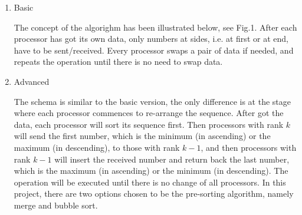 \documentclass[12pt]{article}
\begin{document}
\begin{enumerate}
	\item Basic
	\begin{flushleft}
		The concept of the algorighm has been illustrated below, see Fig.1. After each processor has got its own data, only numbers at sides, i.e. at first or at end, have to be sent/received. Every processor swaps a pair of data if needed, and repeats the operation until there is no need to swap data.
	\end{flushleft}
	\item Advanced
	\begin{flushleft}
		The schema is similar to the basic version, the only difference is at the stage where each processor commences to re-arrange the sequence. After got the data, each processor will sort its sequence first. Then processors with rank $k$ will send the first number, which is the minimum (in ascending) or the maximum (in descending), to those with rank $k-1$, and then processors with rank $k-1$ will insert the received number and return back the last number, which is the maximum (in ascending) or the minimum (in descending). The operation will be executed until there is no change of all processors. In this project, there are two options chosen to be the pre-sorting algorithm, namely merge and bubble sort.
	\end{flushleft}
\end{enumerate}
\end{document}
